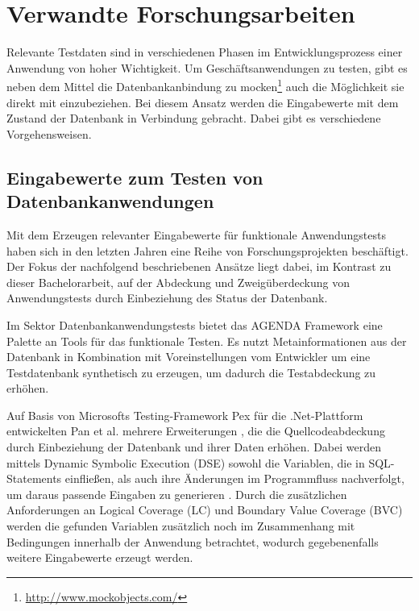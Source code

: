 \section{Verwandte Forschungsarbeiten}\label{chap:relatedwork}

%
%

Relevante Testdaten sind in verschiedenen Phasen im Entwicklungsprozess einer Anwendung von hoher Wichtigkeit.
Um Geschäftsanwendungen zu testen, gibt es neben dem Mittel die Datenbankanbindung zu mocken\footnote{\url{http://www.mockobjects.com/}} auch die Möglichkeit sie direkt mit einzubeziehen.
Bei diesem Ansatz werden die Eingabewerte mit dem Zustand der Datenbank in Verbindung gebracht.
Dabei gibt es verschiedene Vorgehensweisen.

\subsection{Eingabewerte zum Testen von Datenbankanwendungen}
Mit dem Erzeugen relevanter Eingabewerte für funktionale Anwendungstests haben sich in den letzten Jahren eine Reihe von Forschungsprojekten beschäftigt.
Der Fokus der nachfolgend beschriebenen Ansätze liegt dabei, im Kontrast zu dieser Bachelorarbeit, auf der Abdeckung und Zweigüberdeckung von Anwendungstests durch Einbeziehung des Status der Datenbank.

Im Sektor Datenbankanwendungstests bietet das AGENDA Framework \cite{Chays:2000:FTD:347324.348954, Chays:2004:TDG:997669, Chays:2004:ATR:1077269.1077271, Deng:2005:TDT:1062455.1062486, Chays:2008:QTG:1385269.1385277} eine Palette an Tools für das funktionale Testen.
Es nutzt Metainformationen aus der Datenbank in Kombination mit Voreinstellungen vom Entwickler um eine Testdatenbank synthetisch zu erzeugen, um dadurch die Testabdeckung zu erhöhen.

Auf Basis von Microsofts Testing-Framework Pex für die .Net-Plattform \cite{Tillmann:2008:PWB:1792786.1792798} entwickelten Pan et al. mehrere Erweiterungen \cite{Pan:2011:GPI:2190078.2190154, Pan:2011:DSG:1988842.1988846}, die die Quellcodeabdeckung durch Einbeziehung der Datenbank und ihrer Daten erhöhen.
Dabei werden mittels Dynamic Symbolic Execution (DSE) \cite{Cadar:2006:EAG:1180405.1180445, Godefroid:2005:DDA:1065010.1065036} sowohl die Variablen, die in SQL-Statements einfließen, als auch ihre Änderungen im Programmfluss nachverfolgt, um daraus passende Eingaben zu generieren \cite{Pan:2011:GPI:2190078.2190154}.
Durch die zusätzlichen Anforderungen an Logical Coverage (LC) \cite{DBLP:conf/issre/AmmannOH03} und Boundary Value Coverage (BVC) \cite{DBLP:conf/issre/KosmatovLPU04} werden die gefunden Variablen zusätzlich noch im Zusammenhang mit Bedingungen innerhalb der Anwendung betrachtet, wodurch gegebenenfalls weitere Eingabewerte erzeugt werden. 

